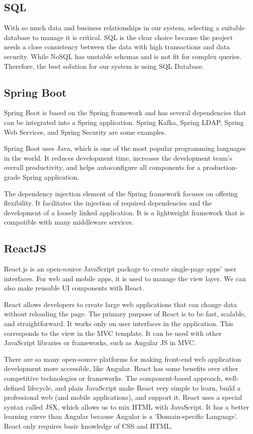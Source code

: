 \subsection{SQL}
With so much data and business relationships in our system, selecting a suitable database to manage it is critical. SQL is the clear choice because the project needs a close consistency between the data with high transactions and data security. While NoSQL has unstable schemas and is not fit for complex queries. Therefore, the best solution for our system is using SQL Database.\cite{mysql}

\subsection{Spring Boot}
Spring Boot is based on the Spring framework and has several dependencies that can be integrated into a Spring application. Spring Kafka, Spring LDAP, Spring Web Services, and Spring Security are some examples. \cite{spring}

Spring Boot uses Java, which is one of the most popular programming languages in the world. It reduces development time, increases the development team's overall productivity, and helps autoconfigure all components for a production-grade Spring application.

The dependency injection element of the Spring framework focuses on offering flexibility. It facilitates the injection of required dependencies and the development of a loosely linked application. It is a lightweight framework that is compatible with many middleware services.

\subsection{ReactJS}
React.js is an open-source JavaScript package to create single-page apps' user interfaces. For web and mobile apps, it is used to manage the view layer. We can also make reusable UI components with React. \cite{reactjs}
 
React allows developers to create large web applications that can change data without reloading the page. The primary purpose of React is to be fast, scalable, and straightforward. It works only on user interfaces in the application. This corresponds to the view in the MVC template. It can be used with other JavaScript libraries or frameworks, such as Angular JS in MVC.

There are so many open-source platforms for making front-end web application development more accessible, like Angular. React has some benefits over other competitive technologies or frameworks. The component-based approach, well-defined lifecycle, and plain JavaScript make React very simple to learn, build a professional web (and mobile applications), and support it. React uses a special syntax called JSX, which allows us to mix HTML with JavaScript. It has a better learning curve than Angular because Angular is a 'Domain-specific Language'. React only requires basic knowledge of CSS and HTML.

